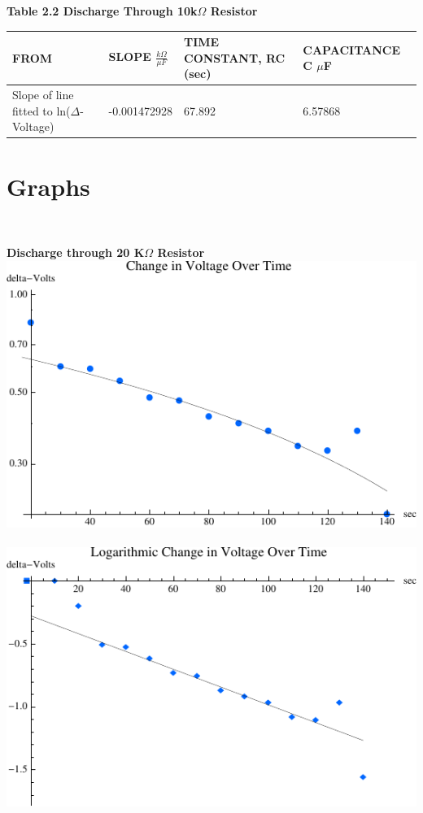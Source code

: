 \documentclass{article}
\begin{document}
\begin{description}
{{\begin{center}
\begin{tabular}{| l | l | l | l | l | l | }
	\end{tabular}
\end{center}
}}
\textbf{Table 2.2 Discharge Through 10k$\Omega$ Resistor } \
{\small{
\begin{center}
	\begin{tabular}{| l | l | l | l |}
	\hline
FROM&SLOPE $\frac{k\Omega}{\mu F}$& TIME CONSTANT, RC (sec)&CAPACITANCE C $\mu$F \\ \hline
Slope of line fitted to ln($\Delta$-Voltage)&-0.001472928&67.892&6.57868\\ \hline
	\end{tabular}
\end{center}
}}
\end{description}
\section{Graphs}\hfill\\
\begin{samepage}
\textbf{Discharge through 20 K$\Omega$ Resistor} \hfill \\
\includegraphics{lab5_graph1}\\ \\
\includegraphics{lab5_graph2}\\
\end{samepage}
\end{document}
